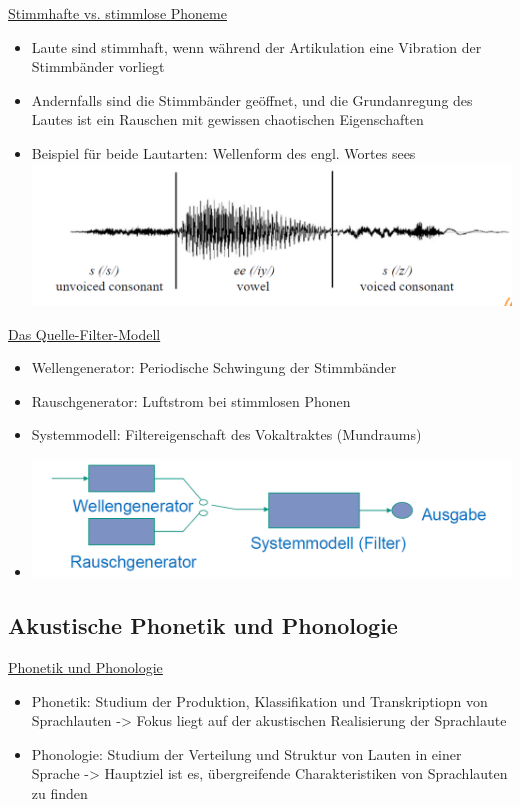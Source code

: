 \documentclass[a4paper,10pt,oneside]{article}
\begin{document}
\underline{Stimmhafte vs. stimmlose Phoneme} \\
	\begin{itemize}
 		\item Laute sind stimmhaft, wenn während der Artikulation eine Vibration der Stimmbänder vorliegt
 		\item Andernfalls sind die Stimmbänder geöffnet, und die Grundanregung des Lautes ist ein Rauschen mit gewissen chaotischen Eigenschaften
 		\item Beispiel für beide Lautarten: Wellenform des engl. Wortes sees \\
 		\includegraphics[scale=0.2]{Grafiken/bsp-sees.png}
	\end{itemize}
 		
\underline{Das Quelle-Filter-Modell} \\
	\begin{itemize}
		\item Wellengenerator: Periodische Schwingung der Stimmbänder
		\item Rauschgenerator: Luftstrom bei stimmlosen Phonen
		\item Systemmodell: Filtereigenschaft des Vokaltraktes (Mundraums)
		\item[] \includegraphics[scale=0.2]{Grafiken/quelle-filter-modell.png}
	\end{itemize}

\subsection{Akustische Phonetik und Phonologie}
\underline{Phonetik und Phonologie} \\
	\begin{itemize}
		\item Phonetik: Studium der Produktion, Klassifikation und Transkriptiopn von Sprachlauten -> Fokus liegt auf der akustischen Realisierung der Sprachlaute
		\item Phonologie: Studium der Verteilung und Struktur von Lauten in einer Sprache -> Hauptziel ist es, übergreifende Charakteristiken von Sprachlauten zu finden
	\end{itemize}
\end{document}
